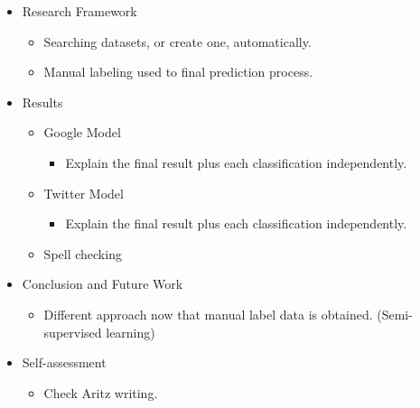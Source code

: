 \begin{itemize}
  \item Research Framework
  \begin{itemize}
    \item Searching datasets, or create one, automatically.
    \item Manual labeling used to final prediction process.
  \end{itemize}

  \item Results
  \begin{itemize}
    \item Google Model
    \begin{itemize}
      \item Explain the final result plus each classification independently.
    \end{itemize}
    \item Twitter Model
    \begin{itemize}
      \item Explain the final result plus each classification independently. 
    \end{itemize}
    \item Spell checking
  \end{itemize}

  \item Conclusion and Future Work
    \begin{itemize}
      \item Different approach now that manual label data is obtained.  (Semi-supervised learning) 
    \end{itemize}
  
  \item Self-assessment
  \begin{itemize}
    \item Check Aritz writing.
  \end{itemize}
\end{itemize}